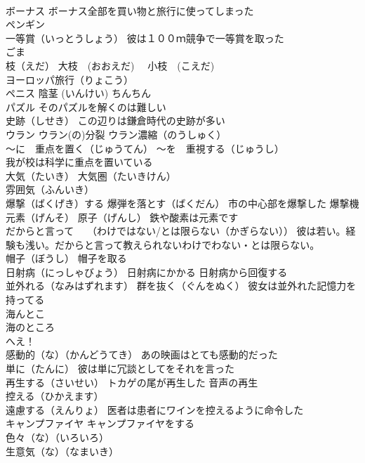\documentclass[8pt]{extreport}
\begin{document}
\begin{CJK}{UTF8}{min}
\\	ボーナス ボーナス全部を買い物と旅行に使ってしまった
\\	ペンギン
\\	一等賞（いっとうしょう） 彼は１００ｍ競争で一等賞を取った
\\	ごま
\\	枝（えだ） 大枝　(おおえだ)　 小枝　(こえだ)
\\	ヨーロッパ旅行（りょこう）
\\	ペニス 陰茎 (いんけい) ちんちん　
\\	パズル そのパズルを解くのは難しい
\\	史跡（しせき） この辺りは鎌倉時代の史跡が多い
\\	ウラン ウラン(の)分裂 ウラン濃縮（のうしゅく）
\\	～に　重点を置く（じゅうてん） ～を　重視する（じゅうし）
\\	我が校は科学に重点を置いている
\\	大気（たいき） 大気圏（たいきけん）
\\	雰囲気（ふんいき）
\\	爆撃（ばくげき）する 爆弾を落とす（ばくだん） 市の中心部を爆撃した 爆撃機
\\	元素（げんそ） 原子（げんし） 鉄や酸素は元素です
\\	だからと言って　 （わけではない/とは限らない（かぎらない）） 彼は若い。経験も浅い。だからと言って教えられないわけでわない・とは限らない。
\\	帽子（ぼうし） 帽子を取る
\\	日射病（にっしゃびょう） 日射病にかかる 日射病から回復する
\\	並外れる（なみはずれます） 群を抜く（ぐんをぬく） 彼女は並外れた記憶力を持ってる
\\	海んとこ 
\\	海のところ
\\	へえ！
\\	感動的（な）（かんどうてき） あの映画はとても感動的だった
\\	単に（たんに） 彼は単に冗談としてをそれを言った
\\	再生する（さいせい） トカゲの尾が再生した 音声の再生
\\	控える（ひかえます） 
\\	遠慮する（えんりょ） 医者は患者にワインを控えるように命令した
\\	キャンプファイヤ キャンプファイヤをする
\\	色々（な）（いろいろ）
\\	生意気（な）（なまいき）

\end{CJK}
\end{document}

